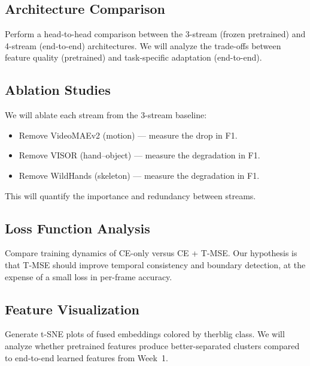 \documentclass[11pt,a4paper]{article}
\begin{document}
\subsection{Architecture Comparison}

Perform a head-to-head comparison between the 3-stream (frozen pretrained) and 4-stream (end-to-end) architectures. We will analyze the trade-offs between feature quality (pretrained) and task-specific adaptation (end-to-end).

\subsection{Ablation Studies}

We will ablate each stream from the 3-stream baseline:

\begin{itemize}[nosep]
  \item Remove VideoMAEv2 (motion) --- measure the drop in F1.
  \item Remove VISOR (hand--object) --- measure the degradation in F1.
  \item Remove WildHands (skeleton) --- measure the degradation in F1.
\end{itemize}

\noindent This will quantify the importance and redundancy between streams.

\subsection{Loss Function Analysis}

Compare training dynamics of CE-only versus CE + T-MSE. Our hypothesis is that T-MSE should improve temporal consistency and boundary detection, at the expense of a small loss in per-frame accuracy.

\subsection{Feature Visualization}

Generate t-SNE plots of fused embeddings colored by therblig class. We will analyze whether pretrained features produce better-separated clusters compared to end-to-end learned features from Week~1.
\end{document}
